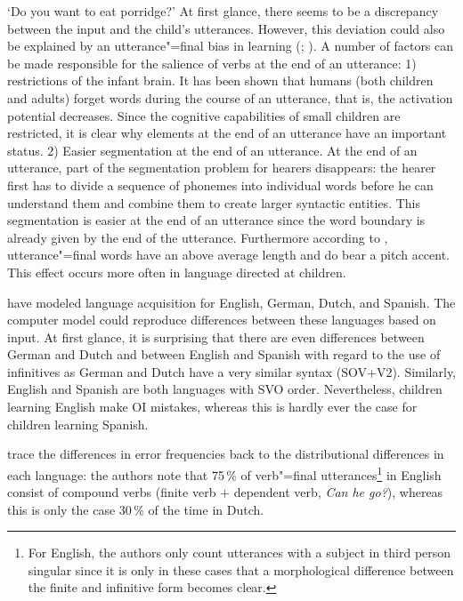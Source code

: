 \glt `Do you want to eat porridge?'
\z
At first glance, there seems to be a discrepancy between the input and the child's utterances.
However, this deviation could also be explained by an utterance"=final bias in learning (\citealp{WKG2001a}; \citealp*{FPG2006a}).
A number of factors can be made responsible for the salience of verbs at the end of an utterance:
1) restrictions of the infant brain. It has been shown that humans (both children and adults) forget words during the course of an
utterance, that is, the activation potential decreases. Since the cognitive capabilities of small children are restricted,
it is clear why elements at the end of an utterance have an important status. 2) Easier segmentation at
the end of an utterance. At the end of an utterance, part of the segmentation problem for hearers disappears:
the hearer first has to divide a sequence of phonemes into individual words before he can understand them and
combine them to create larger syntactic entities.
This segmentation is easier at the end of an utterance since the word boundary is already given by the end of the utterance.
Furthermore according to \citet*[]{WKG2001a}, utterance"=final words have an above average length and do bear a pitch
accent. This effect occurs more often in language directed at children.

\citet*{FPAG2007a} have modeled language acquisition for English, German, Dutch, and Spanish.
The computer model could reproduce differences between these languages based on input. At first glance, it
is surprising that there are even differences between German and Dutch and between English and Spanish with regard to the use of infinitives as
German and Dutch have a very similar syntax (SOV+V2). Similarly, English and Spanish are both languages with SVO order.
Nevertheless, children learning English make OI mistakes, whereas this is hardly ever the case for children learning Spanish.

\citet*{FPAG2007a} trace the differences in error frequencies back to the distributional differences in each language:
the authors note that 75\,\% of verb"=final utterances\footnote{
	For English, the authors only count utterances with a subject in third person singular since it is only in these cases
	that a morphological difference between the finite and infinitive form becomes clear.%
}
in English consist of compound verbs (finite verb $+$ dependent verb, \eg \emph{Can he go?}), whereas this is only the case
30\,\% of the time in Dutch.

